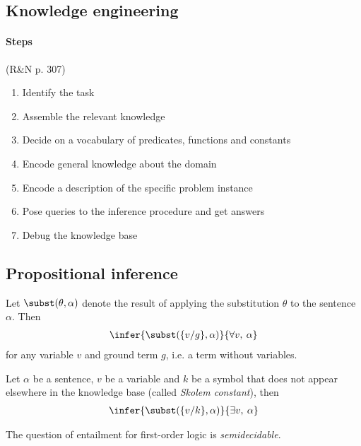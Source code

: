 \documentclass{article}
\begin{document}
\subsection{Knowledge engineering}

\paragraph{Steps}(R\&N p. 307)
\begin{enumerate}
	\item Identify the task
	\item Assemble the relevant knowledge
	\item Decide on a vocabulary of predicates, functions and constants
	\item Encode general knowledge about the domain
	\item Encode a description of the specific problem instance
	\item Pose queries to the inference procedure and get answers
	\item Debug the knowledge base
\end{enumerate}

\subsection{Propositional inference}

\begin{theorem}
	Let $\subst(\theta, \alpha)$ denote the result of applying
	the substitution $\theta$ to the sentence $\alpha$. Then
	\begin{align*}
		\infer{\subst(\{v/g\},\alpha)}{\forall v,\:\alpha}
	\end{align*}
	for any variable $v$ and ground term $g$, i.e. a term without variables.
\end{theorem}

\begin{theorem}
	Let $\alpha$ be a sentence, $v$ be a variable and $k$ be a
	symbol that does not appear elsewhere in the knowledge base
	(called \emph{Skolem constant}), then
	\begin{align*}
		\infer{\subst(\{v/k\},\alpha)}{\exists v,\:\alpha}
	\end{align*}
\end{theorem}

\begin{theorem}[R\&N p. 325]
	The question of entailment for first-order logic is \emph{semidecidable}.
\end{theorem}
\end{document}

